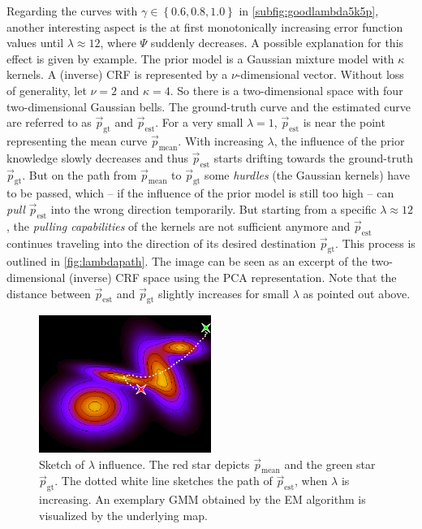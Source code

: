 Regarding the curves with $\gamma \in \left\{0.6, 0.8, 1.0\right\}$ in \autoref{subfig:goodlambda5k5p}, another interesting aspect is the at first monotonically increasing error function values until $\lambda \approx 12$, where $\Psi$ suddenly decreases. A possible explanation for this effect is given by example. The prior model is a Gaussian mixture model with $\kappa$ kernels. A (inverse) CRF is represented by a $\nu$-dimensional vector. Without loss of generality, let $\nu = 2$ and $\kappa = 4$. So there is a two-dimensional space with four two-dimensional Gaussian bells. The ground-truth curve and the estimated curve are referred to as $\vec{p}_{\text{gt}}$ and $\vec{p}_{\text{est}}$. For a very small $\lambda = 1$, $\vec{p}_{\text{est}}$ is near the point representing the mean curve $\vec{p}_{\text{mean}}$. With increasing $\lambda$, the influence of the prior knowledge slowly decreases and thus $\vec{p}_{\text{est}}$ starts drifting towards the ground-truth $\vec{p}_{\text{gt}}$. But on the path from $\vec{p}_{\text{mean}}$ to $\vec{p}_{\text{gt}}$ some \emph{hurdles} (the Gaussian kernels) have to be passed, which -- if the influence of the prior model is still too high -- can \emph{pull} $\vec{p}_{\text{est}}$ into the wrong direction temporarily. But starting from a specific $\lambda \approx 12$, the \emph{pulling capabilities} of the kernels are not sufficient anymore and $\vec{p}_{\text{est}}$ continues traveling into the direction of its desired destination $\vec{p}_{\text{gt}}$. This process is outlined in \autoref{fig:lambdapath}. The image can be seen as an excerpt of the two-dimensional (inverse) CRF space using the PCA representation. Note that the distance between $\vec{p}_{\text{est}}$ and $\vec{p}_{\text{gt}}$ slightly increases for small $\lambda$ as pointed out above.

\begin{figure}[tb]
	\centering
		\includegraphics[width=0.5\textwidth]{images/lambda_path.png}
	\caption[Sketch of $\lambda$ influence]{Sketch of $\lambda$ influence. The red star depicts $\vec{p}_{\text{mean}}$ and the green star $\vec{p}_{\text{gt}}$. The dotted white line sketches the path of $\vec{p}_{\text{est}}$, when $\lambda$ is increasing. An exemplary GMM obtained by the EM algorithm is visualized by the underlying map.}
	\label{fig:lambdapath}
\end{figure}






